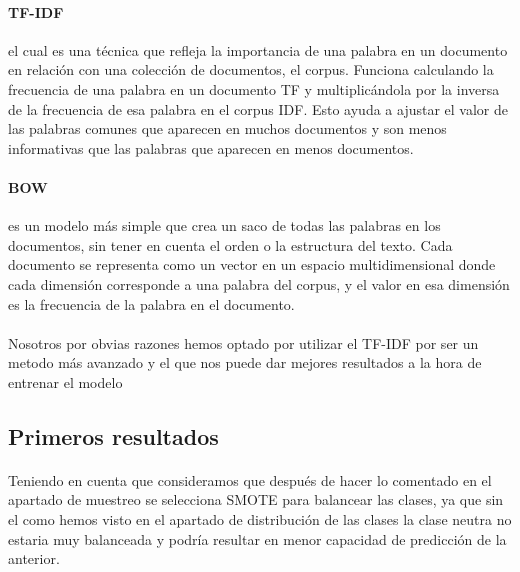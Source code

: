 \documentclass{report}
\begin{document}
                \paragraph*{TF-IDF}{
                      el cual es una técnica que refleja la importancia de una palabra en un documento en relación con una colección de documentos, el corpus. Funciona calculando la frecuencia de una palabra en un documento TF y multiplicándola por la inversa de la frecuencia de esa palabra en el corpus IDF. Esto ayuda a ajustar el valor de las palabras comunes que aparecen en muchos documentos y son menos informativas que las palabras que aparecen en menos documentos.
                }
                \paragraph*{BOW}{
                     es un modelo más simple que crea un saco de todas las palabras en los documentos, sin tener en cuenta el orden o la estructura del texto. Cada documento se representa como un vector en un espacio multidimensional donde cada dimensión corresponde a una palabra del corpus, y el valor en esa dimensión es la frecuencia de la palabra en el documento.
                }
                \paragraph*{}{
                    Nosotros por obvias razones hemos optado por utilizar el TF-IDF por ser un metodo más avanzado y el que nos puede dar mejores resultados a la hora de entrenar el modelo
                }    
            \clearpage\subsection{Primeros resultados}
                \paragraph*{}{
                Teniendo en cuenta que consideramos que después de hacer lo comentado en el apartado de muestreo se selecciona SMOTE para balancear las clases, ya que sin el como hemos visto en el apartado de distribución de las clases la clase neutra no estaria muy balanceada y podría resultar en menor capacidad de predicción de la anterior.
                }
\end{document}
